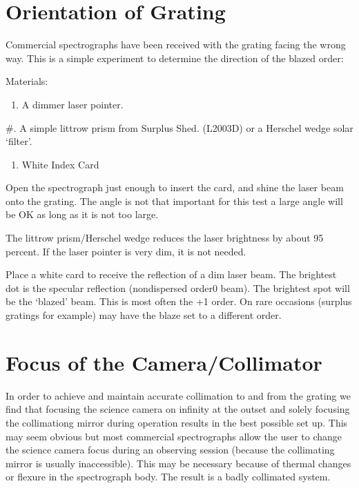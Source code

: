 \documentclass[letterpaper,10pt,english,openany,oneside]{sphinxmanual}
\begin{document}
\section{Orientation of Grating}
\label{\detokenize{experiments:orientation-of-grating}}
\sphinxAtStartPar
Commercial spectrographs have been received with the grating
facing the wrong way. This is a simple experiment to determine
the direction of the blazed order:

\sphinxAtStartPar
Materials:
\begin{enumerate}
%
\item {} 
\sphinxAtStartPar
A dimmer laser pointer.

\end{enumerate}

\sphinxAtStartPar
\#. A simple littrow prism from Surplus Shed. (L2003D) or a Herschel wedge
solar ‘filter’.
\begin{enumerate}
%
\item {} 
\sphinxAtStartPar
White Index Card

\end{enumerate}

\sphinxAtStartPar
Open the spectrograph just enough to insert the card, and shine the laser beam
onto the grating. The angle is not that important for this test a large angle
will be OK \textendash{} as long as it is not too large.

\sphinxAtStartPar
The littrow prism/Herschel wedge reduces the laser brightness by about 95 percent.
If the laser pointer is very dim, it is not needed.

\sphinxAtStartPar
Place a white card to receive the reflection of a dim laser beam. The brightest
dot is the specular reflection (non\sphinxhyphen{}dispersed order\sphinxhyphen{}0 beam). The brightest
spot will be the ‘blazed’ beam. This is most often the +1 order. On rare
occasions (surplus gratings for example) may have the blaze set to a different
order.


\section{Focus of the Camera/Collimator}
\label{\detokenize{experiments:focus-of-the-camera-collimator}}
\sphinxAtStartPar
In order to achieve and maintain accurate collimation to and from
the grating we find that focusing the science camera on infinity at the
outset and solely focusing the collimationg mirror during operation
results in the best possible set up.  This may seem obvious but most
commercial spectrographs allow the user to change the science camera
focus during an observing session (because the collimating mirror is
usually inaccessible).  This may be necessary because of thermal
changes or flexure in the spectrograph body.  The result is
a badly collimated system.
\end{document}
